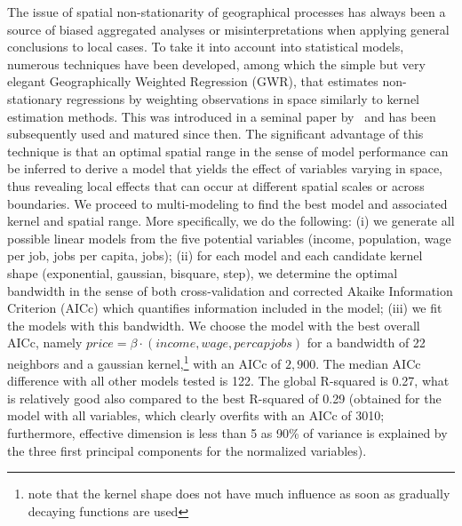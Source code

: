 \documentclass[3p,times,procedia]{elsarticle}
\begin{document}
The issue of spatial non-stationarity of geographical processes has always been a source of biased aggregated analyses or misinterpretations when applying general conclusions to local cases. To take it into account into statistical models, numerous techniques have been developed, among which the simple but very elegant Geographically Weighted Regression (GWR), that estimates non-stationary regressions by weighting observations in space similarly to kernel estimation methods. This was introduced in a seminal paper by~\cite{brunsdon1996geographically} and has been subsequently used and matured since then. The significant advantage of this technique is that an optimal spatial range in the sense of model performance can be inferred to derive a model that yields the effect of variables varying in space, thus revealing local effects that can occur at different spatial scales or across boundaries. We proceed to multi-modeling to find the best model and associated kernel and spatial range. More specifically, we do the following: (i) we generate all possible linear models from the five potential variables (income, population, wage per job, jobs per capita, jobs); (ii) for each model and each candidate kernel shape (exponential, gaussian, bisquare, step), we determine the optimal bandwidth in the sense of both cross-validation and corrected Akaike Information Criterion (AICc) which quantifies information included in the model; (iii) we fit the models with this bandwidth. We choose the model with the best overall AICc, namely $price = \beta\cdot\left( income, wage, percapjobs\right)$ for a bandwidth of 22 neighbors and a gaussian kernel,\footnote{note that the kernel shape does not have much influence as soon as gradually decaying functions are used} with an AICc of $2,900$. The median AICc difference with all other models tested is 122. The global R-squared is 0.27, what is relatively good also compared to the best R-squared of 0.29 (obtained for the model with all variables, which clearly overfits with an AICc of 3010; furthermore, effective dimension is less than 5 as 90\% of variance is explained by the three first principal components for the normalized variables).
\end{document}
